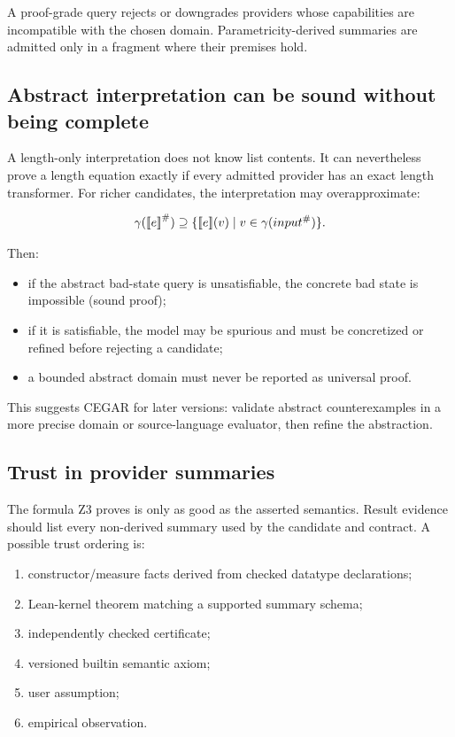 \documentclass[11pt,oneside]{article}
\providecommand{\llbracket}{\mathopen{[\mkern-3mu[}}
\providecommand{\rrbracket}{\mathclose{]\mkern-3mu]}}
\begin{document}
A proof-grade query rejects or downgrades providers whose capabilities are incompatible
with the chosen domain. Parametricity-derived summaries are admitted only in a fragment
where their premises hold.

\subsection{Abstract interpretation can be sound without being complete}

A length-only interpretation does not know list contents. It can nevertheless prove a
length equation exactly if every admitted provider has an exact length transformer.
For richer candidates, the interpretation may overapproximate:

\[
  \gamma(\llbracket e \rrbracket^{\#}) \supseteq
  \{\llbracket e \rrbracket(v)\mid v\in\gamma(input^{\#})\}.
\]

Then:

\begin{itemize}
  \item if the abstract bad-state query is unsatisfiable, the concrete bad state is
        impossible (sound proof);
  \item if it is satisfiable, the model may be spurious and must be concretized or
        refined before rejecting a candidate;
  \item a bounded abstract domain must never be reported as universal proof.
\end{itemize}

This suggests CEGAR for later versions: validate abstract counterexamples in a more
precise domain or source-language evaluator, then refine the abstraction.

\subsection{Trust in provider summaries}

The formula Z3 proves is only as good as the asserted semantics. Result evidence should
list every non-derived summary used by the candidate and contract. A possible trust
ordering is:

\begin{enumerate}
  \item constructor/measure facts derived from checked datatype declarations;
  \item Lean-kernel theorem matching a supported summary schema;
  \item independently checked certificate;
  \item versioned builtin semantic axiom;
  \item user assumption;
  \item empirical observation.
\end{enumerate}
\end{document}
